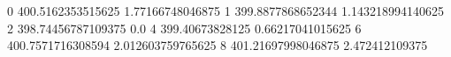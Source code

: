 0 400.5162353515625 1.77166748046875
1 399.8877868652344 1.143218994140625
2 398.74456787109375 0.0
4 399.40673828125 0.66217041015625
6 400.7571716308594 2.012603759765625
8 401.21697998046875 2.472412109375
